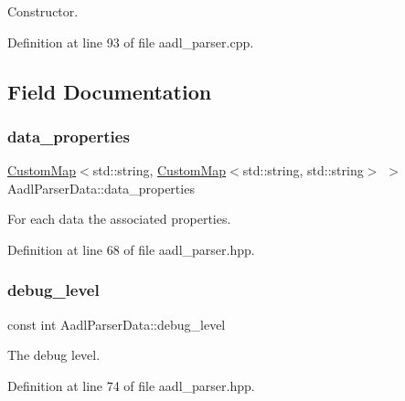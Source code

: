 Constructor. 



Definition at line 93 of file aadl\+\_\+parser.\+cpp.



\subsection{Field Documentation}
\mbox{\label{structAadlParserData_a714f626b9b094cd0a06396bfaac29da3}} 
\subsubsection{\texorpdfstring{data\+\_\+properties}{data\_properties}}
{\footnotesize\ttfamily \hyperlink{custom__map_8hpp_a18ca01763abbe3e5623223bfe5aaac6b}{Custom\+Map}$<$std\+::string, \hyperlink{custom__map_8hpp_a18ca01763abbe3e5623223bfe5aaac6b}{Custom\+Map}$<$std\+::string, std\+::string$>$ $>$ Aadl\+Parser\+Data\+::data\+\_\+properties}



For each data the associated properties. 



Definition at line 68 of file aadl\+\_\+parser.\+hpp.

\mbox{\label{structAadlParserData_af4014ed6f035424d1e9a725115b73ee6}} 
\subsubsection{\texorpdfstring{debug\+\_\+level}{debug\_level}}
{\footnotesize\ttfamily const int Aadl\+Parser\+Data\+::debug\+\_\+level}



The debug level. 



Definition at line 74 of file aadl\+\_\+parser.\+hpp.

\mbox{\label{structAadlParserData_aad068460d86339327e88d4a6e48a7d27}} 

